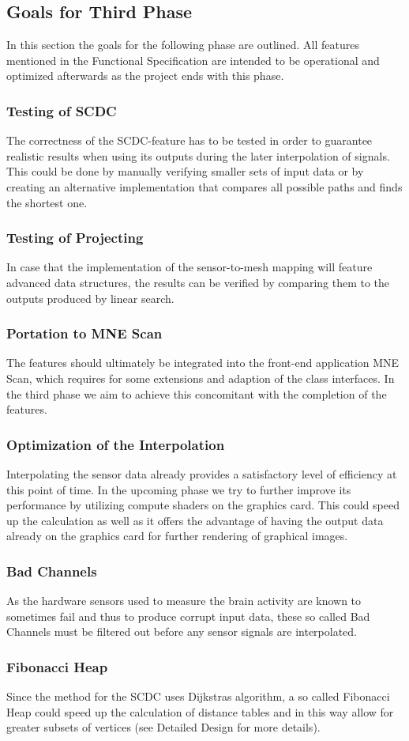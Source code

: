 \subsection{Goals for Third Phase}
In this section the goals for the following phase are outlined. All features mentioned in the Functional Specification are intended to be operational and optimized afterwards as the project ends with this phase.

\subsubsection{Testing of SCDC}
The correctness of the SCDC-feature has to be tested in order to guarantee realistic results when using its outputs during the later interpolation of signals. This could be done by manually verifying smaller sets of input data or by creating an alternative implementation that compares all possible paths and finds the shortest one.
\subsubsection{Testing of Projecting}
In case that the implementation of the sensor-to-mesh mapping will feature advanced data structures, the results can be verified by comparing them to the outputs produced by linear search.
\subsubsection{Portation to MNE Scan}
The features should ultimately be integrated into the front-end application MNE Scan, which requires for some extensions and adaption of the class interfaces. In the third phase we aim to achieve this concomitant with the completion of the features.
\subsubsection{Optimization of the Interpolation}
Interpolating the sensor data already provides a satisfactory level of efficiency at this point of time. In the upcoming phase we try to further improve its performance by utilizing compute shaders on the graphics card. This could speed up the calculation as well as it offers the advantage of having the output data already on the graphics card for further rendering of graphical images.
\subsubsection{Bad Channels}
As the hardware sensors used to measure the brain activity are known to sometimes fail and thus to produce corrupt input data, these so called Bad Channels must be filtered out before any sensor signals are interpolated.
\subsubsection{Fibonacci Heap}
Since the method for the SCDC uses Dijkstras algorithm, a so called Fibonacci Heap could speed up the calculation of distance tables and in this way allow for greater subsets of vertices (see Detailed Design for more details).